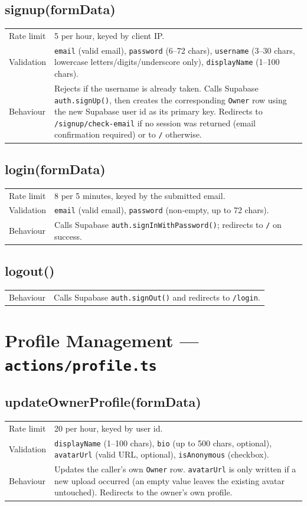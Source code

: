 \documentclass[11pt,a4paper]{article}
\makeatletter
\newcommand{\actiontable}[1]{%
  \begin{tabular}{@{}p{2.6cm}p{10.9cm}@{}}
  #1
  \end{tabular}
}
\makeatother
\begin{document}
\subsection{signup(formData)}
\actiontable{
Rate limit & 5 per hour, keyed by client IP. \\
Validation & \texttt{email} (valid email), \texttt{password} (6--72 chars),
  \texttt{username} (3--30 chars, lowercase letters/digits/underscore only),
  \texttt{displayName} (1--100 chars). \\
Behaviour & Rejects if the username is already taken. Calls Supabase
  \texttt{auth.signUp()}, then creates the corresponding \texttt{Owner} row using the
  new Supabase user id as its primary key. Redirects to \texttt{/signup/check-email} if
  no session was returned (email confirmation required) or to \texttt{/} otherwise. \\
}

\subsection{login(formData)}
\actiontable{
Rate limit & 8 per 5 minutes, keyed by the submitted email. \\
Validation & \texttt{email} (valid email), \texttt{password} (non-empty, up to 72
  chars). \\
Behaviour & Calls Supabase \texttt{auth.signInWithPassword()}; redirects to \texttt{/}
  on success. \\
}

\subsection{logout()}
\actiontable{
Behaviour & Calls Supabase \texttt{auth.signOut()} and redirects to \texttt{/login}. \\
}

\section{Profile Management --- \texttt{actions/profile.ts}}

\subsection{updateOwnerProfile(formData)}
\actiontable{
Rate limit & 20 per hour, keyed by user id. \\
Validation & \texttt{displayName} (1--100 chars), \texttt{bio} (up to 500 chars,
  optional), \texttt{avatarUrl} (valid URL, optional), \texttt{isAnonymous}
  (checkbox). \\
Behaviour & Updates the caller's own \texttt{Owner} row. \texttt{avatarUrl} is only
  written if a new upload occurred (an empty value leaves the existing avatar
  untouched). Redirects to the owner's own profile. \\
}
\end{document}
